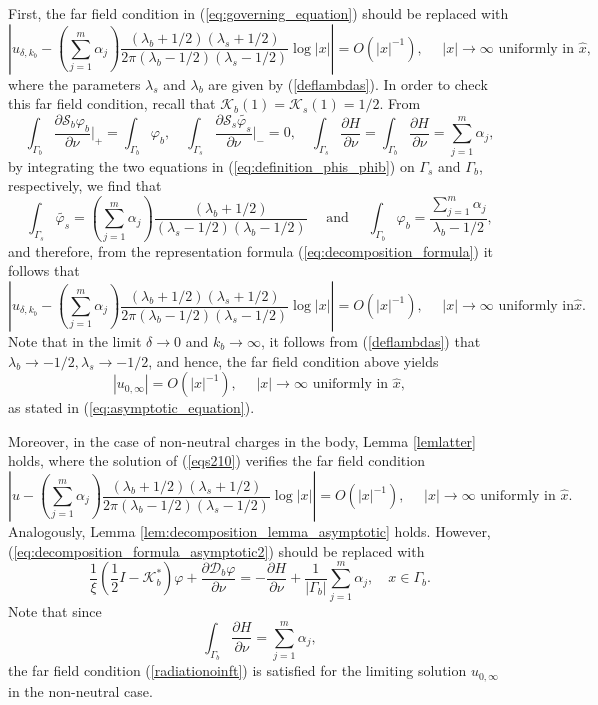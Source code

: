 \documentclass[final]{siamltex}
\newcommand{\ds}{\displaystyle}
\numberwithin{equation}{section}
\numberwithin{figure}{section}
\numberwithin{table}{section}
\begin{document}
First, the far field condition in (\ref{eq:governing_equation})
should be replaced with
\begin{equation} \label{eq:governing_equation_rad}
\left|u_{\delta,k_{b}} - (\sum_{j=1}^m \alpha_j)  \frac{(\lambda_b
+ 1/2) (\lambda_s + 1/2)}{2 \pi (\lambda_b -1/2) (\lambda_s -
1/2)} \log |x| \right|  = {O}(\left|x\right|^{-1}), \quad
\,\,\left|x\right|\rightarrow\infty \text{ uniformly in }\hat{x},
\end{equation}
where the parameters $\lambda_{s}$ and $\lambda_{b}$ are given by
(\ref{deflambdas}). In order to check this far field condition,
recall that $\mathcal{K}_b(1) = \mathcal{K}_s(1)=1/2$. From
$$
\int_{\Gamma_b}
\frac{\partial\mathcal{S}_{b}\varphi_{b}}{\partial\nu} \bigg |_{+}
= \int_{\Gamma_b} \varphi_b, \quad \int_{\Gamma_s}
\frac{\partial\mathcal{S}_{s}\tilde{\varphi_{s}}}{\partial\nu}
\bigg |_{-} = 0, \quad \int_{\Gamma_s} \frac{\partial H}{\partial
\nu} = \int_{\Gamma_b} \frac{\partial H}{\partial \nu} =
\sum_{j=1}^m \alpha_j,
$$
by integrating the two equations in
(\ref{eq:definition_phis_phib}) on $\Gamma_s$ and $\Gamma_b$,
respectively, we find that
$$
\int_{\Gamma_s} \tilde{\varphi_{s}} =  (\ds \sum_{j=1}^m \alpha_j)
\frac{(\lambda_b + 1/2)}{(\lambda_s -1/2) (\lambda_b -1/2)} \quad
\mbox{ and } \quad \int_{\Gamma_b} {\varphi_{b}} =
\frac{\sum_{j=1}^m \alpha_j}{\lambda_b -1/2},
$$
and therefore, from the representation formula
(\ref{eq:decomposition_formula}) it follows that
$$\left|u_{\delta,k_{b}} - \ds (\sum_{j=1}^m \alpha_j) \frac{(\lambda_b + 1/2) (\lambda_s +
1/2)}{2 \pi (\lambda_b -1/2) (\lambda_s - 1/2)} \log |x| \right| =
{O}(\left|x\right|^{-1}), \quad
\,\,\left|x\right|\rightarrow\infty \text{ uniformly in
}\hat{x}.$$ Note that in the limit $\delta\rightarrow 0$ and $k_b
\rightarrow \infty$,  it follows from (\ref{deflambdas}) that
$\lambda_b \rightarrow -1/2, \lambda_s \rightarrow -1/2$, and
hence, the far field condition above yields
\begin{equation} \label{radiationoinft}
\left|u_{0,\infty} \right| = {O}(\left|x\right|^{-1}), \quad
\,\,\left|x\right|\rightarrow\infty \text{ uniformly in }\hat{x},
\end{equation}
as stated in (\ref{eq:asymptotic_equation}).

Moreover, in the case of non-neutral charges in the body, Lemma
\ref{lemlatter} holds, where the solution of (\ref{eqs210})
verifies the far field condition
$$
\left|u - \ds (\sum_{j=1}^m \alpha_j) \frac{(\lambda_b + 1/2)
(\lambda_s + 1/2)}{2 \pi (\lambda_b -1/2) (\lambda_s - 1/2)} \log
|x| \right| = {O}(\left|x\right|^{-1}), \quad
\,\,\left|x\right|\rightarrow\infty \text{ uniformly in }\hat{x}.
$$
Analogously, Lemma \ref{lem:decomposition_lemma_asymptotic} holds.
However, (\ref{eq:decomposition_formula_asymptotic2}) should be
replaced with
$$
\frac{1}{\xi}\left(\frac{1}{2}I-\mathcal{K}_{b}^{*}\right)\varphi
+\frac{\partial\mathcal{D}_{b}\varphi}{\partial\nu}=-\frac{\partial
H}{\partial\nu} + \frac{1}{|\Gamma_b|} \sum_{j=1}^m \alpha_j,
\quad x \in \Gamma_b.
$$
Note that since $$\ds \int_{\Gamma_b} \frac{\partial H}{\partial
\nu} = \sum_{j=1}^m \alpha_j,$$ the far field condition
(\ref{radiationoinft}) is satisfied for the limiting solution
$u_{0,\infty}$ in the non-neutral case.
\end{document}
